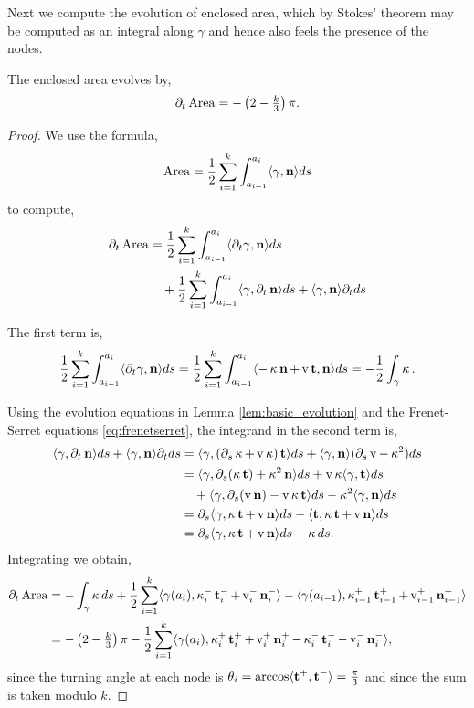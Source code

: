 \documentclass[12pt]{amsart}
\begin{document}
Next we compute the evolution of enclosed area, which by Stokes' theorem may be computed as an integral along \(\gamma\) and hence also feels the presence of the nodes.

\begin{lemma}
\label{lem:dtA}
The enclosed area evolves by,
\[
\partial_t \operatorname{Area} = - \left(2 - \tfrac{k}{3}\right)\pi.
\]
\end{lemma}

\begin{proof}
We use the formula,
\[
\operatorname{Area} = \frac{1}{2} \sum_{i=1}^k \int_{a_{i-1}}^{a_i} \langle{\gamma},{\operatorname{\mathbf{n}}}\rangle ds
\]
to compute,
\[
\begin{split}
\partial_t \operatorname{Area} &= \frac{1}{2} \sum_{i=1}^k \int_{a_{i-1}}^{a_i} \langle{\partial_t \gamma},{\operatorname{\mathbf{n}}}\rangle ds \\
&\quad + \frac{1}{2} \sum_{i=1}^k \int_{a_{i-1}}^{a_i} \langle{\gamma},{\partial_t \operatorname{\mathbf{n}}}\rangle ds + \langle{\gamma},{\operatorname{\mathbf{n}}}\rangle \partial_t ds
\end{split}
\]

The first term is,
\[
\frac{1}{2} \sum_{i=1}^k \int_{a_{i-1}}^{a_i} \langle{\partial_t \gamma},{\operatorname{\mathbf{n}}}\rangle ds = \frac{1}{2} \sum_{i=1}^k \int_{a_{i-1}}^{a_i} \langle{-\operatorname{\kappa}\operatorname{\mathbf{n}}+ \operatorname{v}\operatorname{\mathbf{t}}},{\operatorname{\mathbf{n}}}\rangle ds = -\frac{1}{2} \int_{\gamma} \operatorname{\kappa}.
\]

Using the evolution equations in Lemma \ref{lem:basic_evolution} and the Frenet-Serret equations \eqref{eq:frenetserret}, the integrand in the second term is,
\[
\begin{split}
\langle{\gamma},{\partial_t \operatorname{\mathbf{n}}}\rangle ds + \langle{\gamma},{\operatorname{\mathbf{n}}}\rangle \partial_t ds &= \langle{\gamma},{(\partial_s \operatorname{\kappa} + \operatorname{v} \operatorname{\kappa})\operatorname{\mathbf{t}}}\rangle ds + \langle{\gamma},{\operatorname{\mathbf{n}}}\rangle (\partial_s \operatorname{v} - \operatorname{\kappa}^2) ds \\
&= \langle{\gamma},{\partial_s(\operatorname{\kappa}\operatorname{\mathbf{t}}) + \operatorname{\kappa}^2 \operatorname{\mathbf{n}}}\rangle ds + \operatorname{v}\operatorname{\kappa} \langle{\gamma},{\operatorname{\mathbf{t}}}\rangle ds \\
&\quad + \langle{\gamma},{\partial_s (\operatorname{v} \operatorname{\mathbf{n}}) - \operatorname{v} \operatorname{\kappa} \operatorname{\mathbf{t}}}\rangle ds - \operatorname{\kappa}^2 \langle{\gamma},{\operatorname{\mathbf{n}}}\rangle ds \\
&= \partial_s \langle{\gamma},{\operatorname{\kappa}\operatorname{\mathbf{t}} + \operatorname{v} \operatorname{\mathbf{n}}}\rangle ds - \langle{\operatorname{\mathbf{t}}},{\operatorname{\kappa} \operatorname{\mathbf{t}} + \operatorname{v} \operatorname{\mathbf{n}}}\rangle ds \\
&= \partial_s \langle{\gamma},{\operatorname{\kappa}\operatorname{\mathbf{t}} + \operatorname{v} \operatorname{\mathbf{n}}}\rangle ds - \operatorname{\kappa} ds.
\end{split}
\]
Integrating we obtain,
\begin{equation}
\label{eq:dtA_prelim}
\begin{split}
\partial_t \area &= -\int_{\gamma} \curvecurv ds + \frac{1}{2} \sum_{i=1}^k \ip{\gamma(a_i)}{\curvecurv_i^- \tang_i^- + \tangspeed_i^- \nor_i^-} - \ip{\gamma(a_{i-1})}{\curvecurv_{i-1}^+ \tang_{i-1}^+ + \tangspeed_{i-1}^+ \nor_{i-1}^+} \\
&= - \left(2 - \tfrac{k}{3}\right)\pi - \frac{1}{2} \sum_{i=1}^k \ip{\gamma(a_i)}{\curvecurv_i^+ \tang_i^+ + \tangspeed_i^+ \nor_i^+ - \curvecurv_i^- \tang_i^- - \tangspeed_i^- \nor_i^-},
\end{split}
\end{equation}
since the turning angle at each node is \(\theta_i = \arccos \langle{\operatorname{\mathbf{t}}^+},{\operatorname{\mathbf{t}}^-}\rangle = \tfrac{\pi}{3}\) and since the sum is taken modulo \(k\).


\end{proof}
\end{document}
